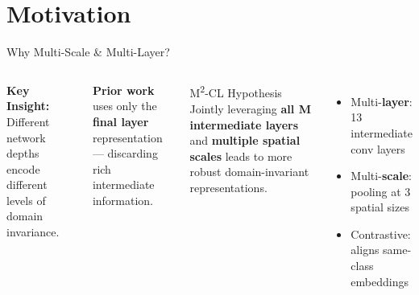 \documentclass[aspectratio=169,10pt]{beamer}
\newcommand{\highlight}[1]{\textcolor{AccentOrange}{\textbf{#1}}}
\begin{document}
\section{Motivation}

\begin{frame}{Why Multi-Scale \& Multi-Layer?}
  \begin{columns}[T]
      \textbf{\color{DarkBlue}Key Insight:} Different network depths encode
      different levels of domain invariance.

      \vspace{0.6em}

      \vspace{0.5em}
      \highlight{Prior work} uses only the \textbf{final layer} representation
      — discarding rich intermediate information.

      \begin{block}{M\textsuperscript{2}-CL Hypothesis}
        Jointly leveraging \textbf{all M intermediate layers} and
        \textbf{multiple spatial scales} leads to more robust
        domain-invariant representations.
      \end{block}

      \vspace{0.5em}
      \begin{itemize}
        \item[$\checkmark$] Multi-\textbf{layer}: 13 intermediate conv layers
        \item[$\checkmark$] Multi-\textbf{scale}: pooling at 3 spatial sizes
        \item[$\checkmark$] Contrastive: aligns same-class embeddings
      \end{itemize}
  \end{columns}
\end{frame}
\end{document}
